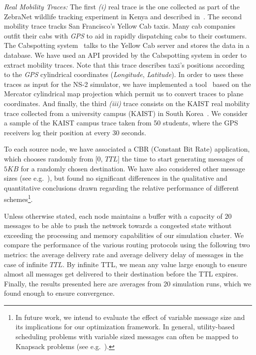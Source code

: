 \emph{Real Mobility Traces:} The first \emph{(i)} real trace is the one collected as part of the ZebraNet wildlife tracking experiment in Kenya and described in~\cite{ZebraNetMovement}. The second mobility trace tracks San Francisco's Yellow Cab taxis. Many cab companies outfit their cabs with \emph{GPS} to aid in rapidly dispatching cabs to their costumers. The Cabspotting system~\cite{Cabspotting} talks to the Yellow Cab server and stores the data in a database. We have used an API provided by the Cabspotting system in order to extract mobility traces. Note that this trace describes taxi's positions according to the \emph{GPS} cylindrical coordinates (\emph{Longitude}, \emph{Latitude}). In order to uses these traces as input for the NS-2 simulator, we have implemented a tool~\cite{DTN-NS2} based on the Mercator cylindrical map projection which permit us to convert traces to plane coordinates. And finally, the third \emph{(iii)} trace consists on the KAIST real mobility trace collected from a university campus (KAIST) in South Korea~\cite{KAIST}. We consider a sample of the KAIST campus trace taken from 50 students, where the GPS receivers log their position at every 30 seconds. 

To each source node, we have associated a CBR (Constant Bit Rate) application, which chooses randomly from [0, $TTL$] the time to start generating messages of $5KB$ for a randomly chosen destination. We have also considered other message sizes (see e.g.~\cite{KrifaBS08}), but found no significant differences in the qualitative and quantitative conclusions drawn regarding the relative performance of different schemes\footnote{In future work, we intend to evaluate the effect of variable message size and its implications for our optimization framework. In general, utility-based scheduling problems with variable sized messages can often be mapped to Knapsack problems (see e.g.~\cite{Boldrini:MSWIM08}).}.

Unless otherwise stated, each node maintains a buffer with a capacity of $20$ messages to be able to push the network towards a congested state without exceeding the processing and memory capabilities of our simulation cluster. We compare the performance of the various routing protocols using the following two metrics: the average delivery rate and average delivery delay of messages in the case of infinite $TTL$. By infinite TTL, we mean any value large enough to ensure almost all messages get delivered to their destination before the TTL expires. Finally, the results presented here are averages from 20 simulation runs, which we found enough to ensure convergence.

